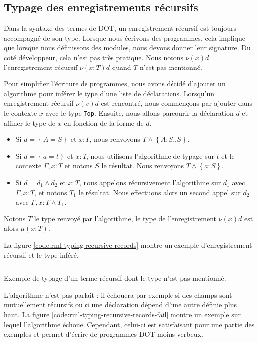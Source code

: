 
\subsection*{Typage des enregistrements récursifs}

Dans la syntaxe des termes de DOT, un enregistrement récursif est toujours accompagné de
son type. Lorsque nous écrivons des programmes, cela implique que lorsque nous
définissons des modules, nous devons donner leur signature. Du
coté développeur, cela n'est pas très pratique. Nous notons $\nu(x) d$
l'enregistrement récursif $\nu(x : T) d$ quand $T$ n'est pas mentionné.

Pour simplifier l'écriture de programmes, nous avons décidé d'ajouter un
algorithme pour inférer le type d'une liste de
déclarations. Lorsqu'un enregistrement récursif $\nu(x) d$ est rencontré,
nous commençons par ajouter dans le contexte $x$ avec le type \verb|Top|.
Ensuite, nous allons parcourir la déclaration $d$ et affiner le type de $x$ en
fonction de la forme de $d$.
\begin{itemize}
\item Si $d = \left\{ A = S \right\}$ et $x : T$, nous renvoyons $T \wedge
  \left\{ A : S .. S \right\}$.
\item Si $d = \left\{ a = t \right\}$ et $x : T$, nous utilisons l'algorithme de
  typage sur $t$ et le contexte $\Gamma, x : T$ et notons $S$ le résultat. Nous
  renvoyons $T \wedge \left\{ a : S \right\}$.
\item Si $d = d_{1} \wedge d_{2}$ et $x : T$, nous appelons récursivement
  l'algorithme sur $d_{1}$ avec $\Gamma, x : T$, et notons $T_{1}$ le résultat. Nous
  effectuons alors un second appel sur $d_{2}$ avec $\Gamma, x : T \wedge T_{1}$.
\end{itemize}
Notons $T$ le type renvoyé par l'algorithme, le type de l'enregistrement $\nu(x)
d$ est alors $\mu(x : T)$.

La figure \ref{code:rml-typing-recursive-records} montre un exemple
d'enregistrement récursif et le type inféré.

\begin{listing}
  \inputminted{OCaml}{codes/typing_recursive_records.rml}
  \caption{Exemple de typage d'un terme récursif dont le type n'est pas
    mentionné.}
  \label{code:rml-typing-recursive-records}
\end{listing}

L'algorithme n'est pas parfait : il échouera par exemple si des champs sont
mutuellement récursifs ou si une déclaration dépend d'une autre définie plus haut. La figure \ref{code:rml-typing-recursive-records-fail}
montre un exemple sur lequel l'algorithme échoue.
Cependant, celui-ci est satisfaisant pour une partie des exemples et permet
d'écrire de programmes DOT moins verbeux.

